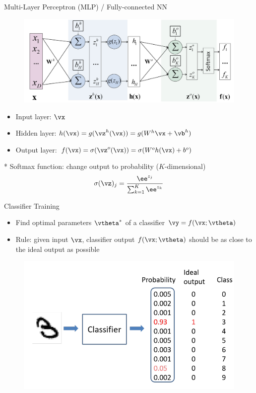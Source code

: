 \documentclass{../TexTemplate/myslide}
\begin{document}
\begin{frame}{Multi-Layer Perceptron (MLP) / Fully-connected NN}
\begin{figure}
\centering
\includegraphics[width=0.8\linewidth]{fig/mlp.png}
\end{figure}
\begin{itemize}
	\item Input layer: $\vx$
	\item Hidden layer: $h(\vx)=g(\vz^h(\vx))=g(W^h\vx+\vb^h)$
	\item Output layer: $f(\vx)=\sigma(\vz^o(\vx))=\sigma(W^o h(\vx)+b^o)$
\end{itemize}
* Softmax function: change output to probability ($K$-dimensional)
\[\sigma(\vz)_j=\frac{\ee^{z_j}}{\sum_{k=1}^K\ee^{z_k}}\]
\end{frame}

\begin{frame}{Classifier Training}
\begin{itemize}
	\item Find optimal parameters $\vtheta^*$ of a classifier $\vy=f(\vx;\vtheta)$
	\item Rule: given input $\vx$, classifier output $f(\vx;\vtheta)$ should be as close to the ideal output as possible
\end{itemize}
\begin{figure}
\centering
\includegraphics[width=0.8\linewidth]{fig/classifier.png}
\end{figure}
\end{frame}
\end{document}
